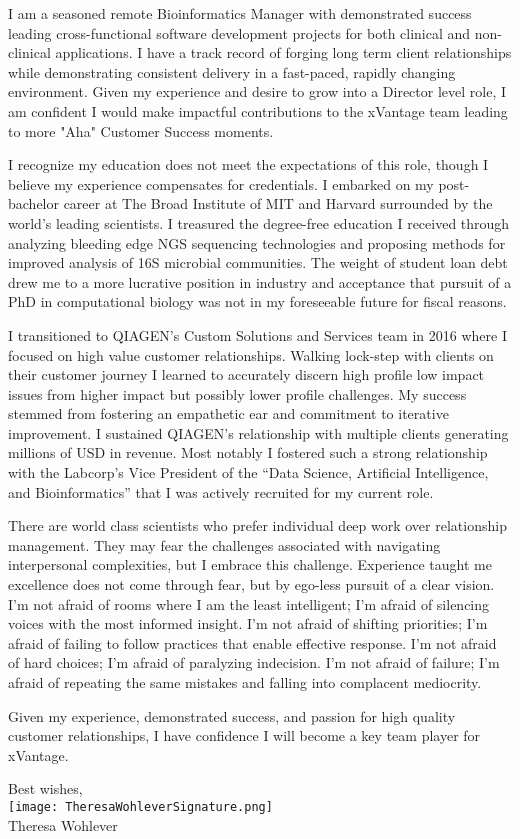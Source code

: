 \documentclass[10pt,letterpaper]{article}
\begin{document}
\begin{flushleft}
I am a seasoned remote Bioinformatics Manager with demonstrated success leading cross-functional software development projects for both clinical and non-clinical applications. I have a track record of forging long term client relationships while demonstrating consistent delivery in a fast-paced, rapidly changing environment. Given my experience and desire to grow into a Director level role, I am confident I would make impactful contributions to the xVantage team leading to more "Aha" Customer Success moments.

I recognize my education does not meet the expectations of this role, though I believe my experience compensates for credentials. I embarked on my post-bachelor career at The Broad Institute of MIT and Harvard surrounded by the world's leading scientists. I treasured the degree-free education I received through analyzing bleeding edge NGS sequencing technologies and proposing methods for improved analysis of 16S microbial communities. The weight of student loan debt drew me to a more lucrative position in industry and acceptance that pursuit of a PhD in computational biology was not in my foreseeable future for fiscal reasons.

I transitioned to QIAGEN's Custom Solutions and Services team in 2016 where I focused on high value customer relationships. Walking lock-step with clients on their customer journey I learned to accurately discern high profile low impact issues from higher impact but possibly lower profile challenges. My success stemmed from fostering an empathetic ear and commitment to iterative improvement. I sustained QIAGEN's relationship with multiple clients generating millions of USD in revenue. Most notably I fostered such a strong relationship with the Labcorp’s Vice President of the “Data Science, Artificial Intelligence, and Bioinformatics” that I was actively recruited for my current role. 
 
There are world class scientists who prefer individual deep work over relationship management. They may fear the challenges associated with navigating interpersonal complexities, but I embrace this challenge. Experience taught me excellence does not come through fear, but by ego-less pursuit of a clear vision. I\rq{}m not afraid of rooms where I am the least intelligent; I\rq{}m afraid of silencing voices with the most informed insight. I\rq{}m not afraid of shifting priorities; I\rq{}m afraid of failing to follow practices that enable effective response. I\rq{}m not afraid of hard choices; I\rq{}m afraid of paralyzing indecision. I\rq{}m not afraid of failure; I\rq{}m afraid of repeating the same mistakes and falling into complacent mediocrity.

Given my experience, demonstrated success, and passion for high quality customer relationships, I have confidence I will become a key team player for xVantage.
\end{flushleft}




\hspace*{.6\linewidth} Best wishes, \\
\hspace*{.57\linewidth} \texttt{[image: TheresaWohleverSignature.png]}  {\vspace{-9pt}} \\
\hspace*{.6\linewidth}  Theresa Wohlever
\end{document}
